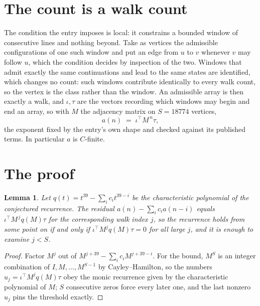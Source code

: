 \documentclass[11pt,a4paper]{article}
\theoremstyle{plain}
\newtheorem{lemma}[theorem]{Lemma}
\theoremstyle{definition}
\begin{document}
\section{The count is a walk count}

The condition the entry imposes is local: it constrains a bounded window of consecutive lines and nothing beyond. Take as vertices the admissible configurations of one such window and put an edge from $u$ to $v$ whenever $v$ may follow $u$, which the condition decides by inspection of the two. Windows that admit exactly the same continuations and lead to the same states are identified, which changes no count: such windows contribute identically to every walk count, so the vertex is the class rather than the window.
An admissible array is then exactly a walk, and $\iota,\tau$ are the vectors recording which windows may begin and end an array, so with $M$ the adjacency matrix on $S=18774$ vertices,
\[
a(n)\;=\;\iota^{\!\top}M^{\,n}\tau ,
\]
the exponent fixed by the entry's own shape and checked against its published terms. In
particular $a$ is $C$-finite.

\section{The proof}

\begin{lemma}\label{lem:crit}
Let $q(t)=t^{39}-\sum_i c_it^{39-i}$ be the characteristic polynomial of the
conjectured recurrence. The residual $a(n)-\sum_ic_ia(n-i)$ equals
$\iota^{\!\top}M^{\,j}q(M)\tau$ for the corresponding walk index $j$, so the recurrence
holds from some point on if and only if $\iota^{\!\top}M^{j}q(M)\tau=0$ for all large $j$,
and it is enough to examine $j<S$.
\end{lemma}

\begin{proof}
Factor $M^{j}$ out of $M^{j+39}-\sum_ic_iM^{j+39-i}$. For the bound, $M^{S}$
is an integer combination of $I,M,\dots,M^{S-1}$ by Cayley--Hamilton, so the numbers
$u_j=\iota^{\!\top}M^{j}q(M)\tau$ obey the monic recurrence given by the characteristic
polynomial of $M$; $S$ consecutive zeros force every later one, and the last nonzero $u_j$
pins the threshold exactly.
\end{proof}
\end{document}
